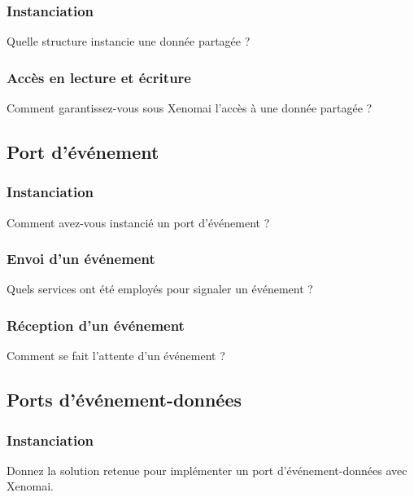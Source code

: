 \documentclass[11pt, a4paper]{paper}
\begin{document}
\subsubsection{Instanciation}
 {\color{blue} Quelle structure instancie une donnée partagée ?}

\subsubsection{Accès en lecture et écriture}
 {\color{blue} Comment garantissez-vous sous Xenomai l'accès à une donnée partagée ?}
 
\subsection{Port d’événement}

\subsubsection{Instanciation}
 {\color{blue} Comment avez-vous instancié un port d'événement ?}
 
\subsubsection{Envoi d’un événement}
 {\color{blue} Quels services ont été employés pour signaler un événement ?}

\subsubsection{Réception d’un événement}
 {\color{blue} Comment se fait l'attente d'un événement ?}



\subsection{Ports d’événement-données}

\subsubsection{Instanciation}
 {\color{blue} Donnez la solution retenue pour implémenter un port d'événement-données avec Xenomai.}
\end{document}

